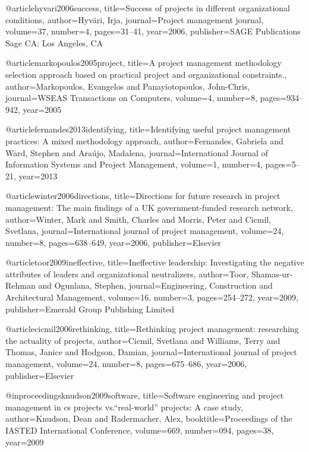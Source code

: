 @article{hyvari2006success,
  title={Success of projects in different organizational conditions},
  author={Hyv{\"a}ri, Irja},
  journal={Project management journal},
  volume={37},
  number={4},
  pages={31--41},
  year={2006},
  publisher={SAGE Publications Sage CA: Los Angeles, CA}
}

@article{markopoulos2005project,
  title={A project management methodology selection approach based on practical project and organizational constraints.},
  author={Markopoulos, Evangelos and Panayiotopoulos, John-Chris},
  journal={WSEAS Transactions on Computers},
  volume={4},
  number={8},
  pages={934--942},
  year={2005}
}

@article{fernandes2013identifying,
  title={Identifying useful project management practices: A mixed methodology approach},
  author={Fernandes, Gabriela and Ward, Stephen and Ara{\'u}jo, Madalena},
  journal={International Journal of Information Systems and Project Management},
  volume={1},
  number={4},
  pages={5--21},
  year={2013}
}

@article{winter2006directions,
  title={Directions for future research in project management: The main findings of a UK government-funded research network},
  author={Winter, Mark and Smith, Charles and Morris, Peter and Cicmil, Svetlana},
  journal={International journal of project management},
  volume={24},
  number={8},
  pages={638--649},
  year={2006},
  publisher={Elsevier}
}

@article{toor2009ineffective,
  title={Ineffective leadership: Investigating the negative attributes of leaders and organizational neutralizers},
  author={Toor, Shamas-ur-Rehman and Ogunlana, Stephen},
  journal={Engineering, Construction and Architectural Management},
  volume={16},
  number={3},
  pages={254--272},
  year={2009},
  publisher={Emerald Group Publishing Limited}
}

@article{cicmil2006rethinking,
  title={Rethinking project management: researching the actuality of projects},
  author={Cicmil, Svetlana and Williams, Terry and Thomas, Janice and Hodgson, Damian},
  journal={International journal of project management},
  volume={24},
  number={8},
  pages={675--686},
  year={2006},
  publisher={Elsevier}
}

@inproceedings{knudson2009software,
  title={Software engineering and project management in cs projects vs.“real-world” projects: A case study},
  author={Knudson, Dean and Radermacher, Alex},
  booktitle={Proceedings of the IASTED International Conference},
  volume={669},
  number={094},
  pages={38},
  year={2009}
}

